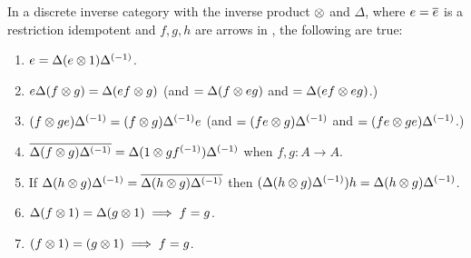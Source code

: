 \begin{lemma}\label{lem:properties_of_delta_and_tensor_in_a_discrete_inverse_category}
  In a discrete inverse category \X with the inverse product $\otimes$ and $\Delta$, where
  $e=\overline{e}$ is a restriction idempotent and $f,g,h$ are arrows in \X, the following are true:
  \begin{enumerate}[{(}i{)}]
    \item{}$e=\Delta (e\otimes 1) {\Delta}^{(-1)}$.\label{le:eisde1}
    \item{}$e\Delta (f \otimes g) = \Delta (e f \otimes g) $ (and $= \Delta (f \otimes e g) $ and
      $ = \Delta (e f \otimes e g)$.)\label{le:deltaefg}
    \item{}$ (f \otimes g e) {\Delta}^{(-1)} =(f \otimes g) {\Delta}^{(-1)} e $ (and $= (f e\otimes g) {\Delta}^{(-1)}$ and
      $ = (f e\otimes g e){\Delta}^{(-1)}$.)\label{le:efginvdelta}
    \item{}$\overline{\Delta (f \otimes g) {\Delta}^{(-1)}} =
       \Delta(1\otimes g {f}^{(-1)}){\Delta}^{(-1)}$ when $f,g:A\to A$. \label{le:restfg}
    \item{} If $\Delta (h \otimes g) {\Delta}^{(-1)} = \overline{\Delta (h \otimes g) {\Delta}^{(-1)}}$ then
      $(\Delta (h \otimes g) {\Delta}^{(-1)}) h = \Delta (h \otimes g) {\Delta}^{(-1)}$.\label{le:hge}
    \item{}$\Delta (f\otimes1) = \Delta (g\otimes1) \implies f = g$.\label{le:dfgisfg}
    \item{}$(f\otimes1) = (g\otimes1) \implies f = g$.\label{le:fgisfg}
  \end{enumerate}
\end{lemma}
